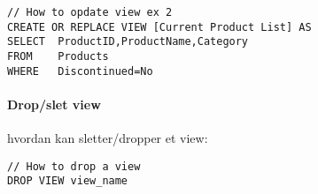 \begin{lstlisting}[caption=Andet eksempel på opdatering af et view.]
// How to opdate view ex 2
CREATE OR REPLACE VIEW [Current Product List] AS
SELECT 	ProductID,ProductName,Category
FROM 	Products
WHERE 	Discontinued=No
\end{lstlisting}

\paragraph{Drop/slet view} hvordan kan sletter/dropper et view: 

\begin{lstlisting}[caption=Dropping af view]
// How to drop a view
DROP VIEW view_name
\end{lstlisting}